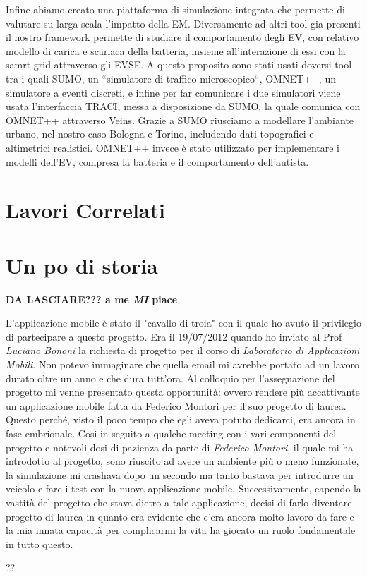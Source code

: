 Infine abiamo creato una piattaforma di simulazione integrata che permette di valutare su larga scala
l'impatto della EM. Diversamente ad altri tool gia presenti il nostro framework permette di studiare 
il comportamento degli EV, con relativo modello di carica e scariaca della batteria, insieme all'interazione
di essi con la samrt grid attraverso gli EVSE. A questo proposito sono stati usati doversi tool tra i quali
SUMO, un ``simulatore di traffico microscopico``, OMNET++, un simulatore a eventi discreti, e infine per 
far comunicare i due simulatori viene usata l'interfaccia TRACI, messa a disposizione da SUMO, la quale
comunica con OMNET++ attraverso Veins. Grazie a SUMO riusciamo a modellare l'ambiante urbano, nel nostro 
caso Bologna e Torino, includendo dati topografici e altimetrici realistici. OMNET++ invece è stato
utilizzato per implementare i modelli dell'EV, compresa la batteria e il comportamento dell'autista.

\section{Lavori Correlati}

\section{Un po di storia} 

\textbf{DA LASCIARE??? a me \emph{MI} piace}

L'applicazione mobile è stato il "cavallo di troia" con il quale ho avuto il privilegio di partecipare a questo progetto. Era il 19/07/2012 quando ho inviato al Prof \emph{Luciano Bononi} la richiesta di progetto per il corso di \emph{Laboratorio di Applicazioni Mobili}. Non potevo immaginare che quella email mi avrebbe portato ad un lavoro durato oltre un anno e che dura tutt'ora.
Al colloquio per l'assegnazione del progetto mi venne presentato questa opportunità: ovvero rendere più accattivante un applicazione mobile fatta da Federico Montori per il suo progetto di laurea. Questo perché, visto il poco tempo che egli aveva potuto dedicarci, era ancora in fase embrionale.
Cosi in seguito a qualche meeting con i vari componenti del progetto e notevoli dosi di pazienza da parte di \emph{Federico Montori}, il quale mi ha introdotto al progetto, sono riuscito ad avere un ambiente più o meno funzionate, la simulazione mi crashava dopo un secondo ma tanto bastava per introdurre un veicolo e fare i test con la nuova applicazione mobile.
Successivamente, capendo la vastità del progetto che stava dietro a tale applicazione, decisi di farlo diventare progetto di laurea in quanto era evidente che c'era ancora molto lavoro da fare e la mia innata capacità per complicarmi la vita ha giocato un ruolo fondamentale in tutto questo.

??

